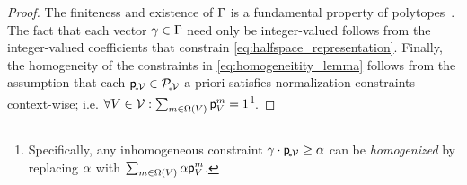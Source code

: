 \documentclass[aps, 10pt, english, twoside, twocolumn, pra, nofootinbib, tightenlines, longbibliography, superscriptaddress]{revtex4-1}
\begin{document}
    \begin{proof}
        The finiteness and existence of $\Gamma$ is a fundamental property of polytopes~\cite{Matousek_2013,Ziegler_1995,Abramsky_2012,Dantzig_1973,jones_2004}. The fact that each vector $\gamma \in \Gamma$ need only be integer-valued follows from the integer-valued coefficients that constrain \cref{eq:halfspace_representation}. Finally, the homogeneity of the constraints in \cref{eq:homogeneitity_lemma} follows from the assumption that each ${\mathsf{p}}_{\!{}_*\!\mathcal{V}} \in \mathcal{P}_{\!{}_*\!\mathcal{V}}$ a priori satisfies normalization constraints context-wise; i.e. $\forall V \in \mscenario : \sum_{m \in \events{V}} \prob{V}^{m} = 1$\footnote{Specifically, any inhomogeneous constraint $\gamma \cdot {\mathsf{p}}_{\!{}_*\!\mathcal{V}} \geq \alpha$ can be \textit{homogenized} by replacing $\alpha$ with $\sum_{m \in \events{V}} \al \prob{V}^{m}$.}.
    \end{proof}


\end{document}
